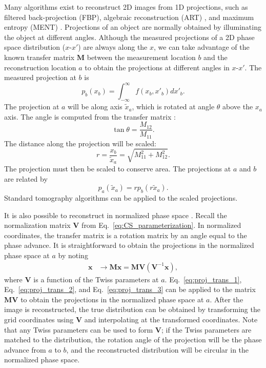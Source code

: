 Many algorithms exist to reconstruct 2D images from 1D projections, such as filtered back-projection (FBP), algebraic reconstruction (ART) \cite{Slaney1988}, and maximum entropy (MENT) \cite{Minerbo1979}. Projections of an object are normally obtained by illuminating the object at different angles. Although the measured projections of a 2D phase space distribution ($x$-$x'$) are always along the $x$, we can take advantage of the known transfer matrix $\mathbf{M}$ between the measurement location $b$ and the reconstruction location $a$ to obtain the projections at different angles in $x$-$x'$. The measured projection at $b$ is
%
\begin{equation}
    p_b(x_b) = \int_{-\infty}^{\infty} f(x_b, x'_b) dx'_b.
\end{equation}
%
The projection at $a$ will be along axis $\tilde{x}_a$, which is rotated at angle $\theta$ above the $x_a$ axis. The angle is computed from the transfer matrix \cite{Hock2013a}:
%
\begin{equation}\label{eq:proj_trans_1}
    \tan\theta = \frac{M_{12}}{M_{11}}.
\end{equation}
%
The distance along the projection will be scaled:
%
\begin{equation}\label{eq:proj_trans_2}
    r = \frac{x_b}{\tilde{x}_a} = \sqrt{M_{11}^2 + M_{12}^2}.
\end{equation}
%
The projection must then be scaled to conserve area. The projections at $a$ and $b$ are related by 
%
\begin{equation}\label{eq:proj_trans_3}
    p_a(\tilde{x}_a) = r p_b(r \tilde{x}_a).
\end{equation}
%
Standard tomography algorithms can be applied to the scaled projections.

It is also possible to reconstruct in normalized phase space \cite{Hock2011}. Recall the normalization matrix $\mathbf{V}$ from Eq.~\eqref{eq:CS_parameterization}. In normalized coordinates, the transfer matrix is a rotation matrix by an angle equal to the phase advance. It is straightforward to obtain the projections in the normalized phase space at $a$ by noting
%
\begin{equation}
\begin{aligned}
    \mathbf{x} &\rightarrow \mathbf{M} \mathbf{x}
    = \mathbf{M} \mathbf{V} (\mathbf{V}^{-1} \mathbf{x})
    ,
\end{aligned}
\end{equation}
%
where $\mathbf{V}$ is a function of the Twiss parameters at $a$. Eq.~\eqref{eq:proj_trans_1}, Eq.~\eqref{eq:proj_trans_2}, and Eq.~\eqref{eq:proj_trans_3} can be applied to the matrix $\mathbf{M} \mathbf{V}$ to obtain the projections in the normalized phase space at $a$. After the image is reconstructed, the true distribution can be obtained by transforming the grid coordinates using $\mathbf{V}$ and interpolating at the transformed coordinates. Note that any Twiss parameters can be used to form $\mathbf{V}$; if the Twiss parameters are matched to the distribution, the rotation angle of the projection will be the phase advance from $a$ to $b$, and the reconstructed distribution will be circular in the normalized phase space. 


